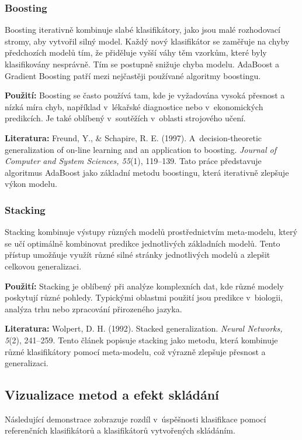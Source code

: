 \subsubsection{Boosting}
Boosting iterativně kombinuje slabé klasifikátory, jako jsou malé rozhodovací stromy, aby vytvořil silný model. Každý nový klasifikátor se zaměřuje na chyby předchozích modelů tím, že přiděluje vyšší váhy těm vzorkům, které byly klasifikovány nesprávně. Tím se postupně snižuje chyba modelu. AdaBoost a Gradient Boosting patří mezi nejčastěji používané algoritmy boostingu.

\textbf{Použití:} Boosting se často používá tam, kde je vyžadována vysoká přesnost a nízká míra chyb, například v~lékařské diagnostice nebo v~ekonomických predikcích. Je také oblíbený v~soutěžích v~oblasti strojového učení.

\textbf{Literatura:} Freund, Y., \& Schapire, R. E. (1997). A~decision-theoretic generalization of on-line learning and an application to boosting. \textit{Journal of Computer and System Sciences, 55}(1), 119–139. \cite{freund1997boosting} Tato práce představuje algoritmus AdaBoost jako základní metodu boostingu, která iterativně zlepšuje výkon modelu.

\subsubsection{Stacking}
Stacking kombinuje výstupy různých modelů prostřednictvím meta-modelu, který se učí optimálně kombinovat predikce jednotlivých základních modelů. Tento přístup umožňuje využít různé silné stránky jednotlivých modelů a zlepšit celkovou generalizaci.

\textbf{Použití:} Stacking je oblíbený při analýze komplexních dat, kde různé modely poskytují různé pohledy. Typickými oblastmi použití jsou predikce v~biologii, analýza trhu nebo zpracování přirozeného jazyka.

\textbf{Literatura:} Wolpert, D. H. (1992). Stacked generalization. \textit{Neural Networks, 5}(2), 241–259. \cite{wolpert1992stacking} Tento článek popisuje stacking jako metodu, která kombinuje různé klasifikátory pomocí meta-modelu, což výrazně zlepšuje přesnost a generalizaci.

\subsection{Vizualizace metod a efekt skládání}
Následující demonstrace zobrazuje rozdíl v~úspěšnosti klasifikace pomocí referenčních klasifikátorů a klasifikátorů vytvořených skládáním. 


